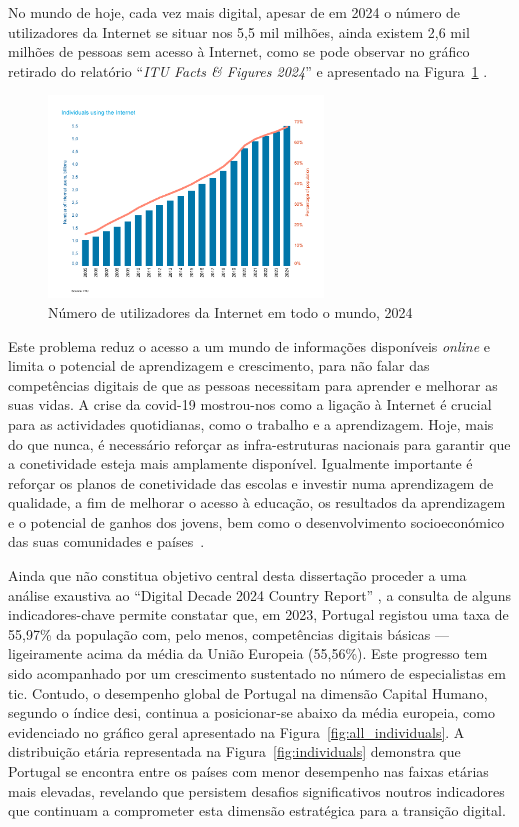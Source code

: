No mundo de hoje, cada vez mais digital, apesar de em 2024 o número de utilizadores da Internet se situar nos 5,5 mil milhões, ainda existem 2,6 mil milhões de pessoas sem acesso à Internet, como se pode observar no gráfico retirado do relatório ``\textit{ITU Facts \& Figures 2024}'' e apresentado na Figura~\ref{fig:numutilizadoresnet} \cite{broadbandcomission, itu2024facts}.

\begin{figure}[hbtp]
    \centering
    \includegraphics[width=0.65\textwidth]{figures/ITU-InternetUse.png}
    \caption{Número de utilizadores da Internet em todo o mundo, 2024 \cite{itu2024facts}}
    \label{fig:numutilizadoresnet}
\end{figure}
Este problema reduz o acesso a um mundo de informações disponíveis \textit{online} e limita o potencial de aprendizagem e crescimento, para não falar das competências digitais de que as pessoas necessitam para aprender e melhorar as suas vidas.
A crise da \acrshort{covid-19} mostrou-nos como a ligação à Internet é crucial para as actividades quotidianas, como o trabalho e a aprendizagem. Hoje, mais do que nunca, é necessário reforçar as infra-estruturas nacionais para garantir que a conetividade esteja mais amplamente disponível. Igualmente importante é reforçar os planos de conetividade das escolas e investir numa aprendizagem de qualidade, a fim de melhorar o acesso à educação, os resultados da aprendizagem e o potencial de ganhos dos jovens, bem como o desenvolvimento socioeconómico das suas comunidades e países~\cite{TheDigitransf}.

Ainda que não constitua objetivo central desta dissertação proceder a uma análise exaustiva ao ``Digital Decade 2024 Country Report'' \cite{DESI2024}, a consulta de alguns indicadores-chave permite constatar que, em 2023, Portugal registou uma taxa de 55,97\% da população com, pelo menos, competências digitais básicas — ligeiramente acima da média da União Europeia (55,56\%). Este progresso tem sido acompanhado por um crescimento sustentado no número de especialistas em \acrshort{tic}.
Contudo, o desempenho global de Portugal na dimensão Capital Humano, segundo o índice \acrshort{desi}, continua a posicionar-se abaixo da média europeia, como evidenciado no gráfico geral apresentado na Figura~\ref{fig:all_individuals}. A distribuição etária representada na Figura~\ref{fig:individuals} demonstra que Portugal se encontra entre os países com menor desempenho nas faixas etárias mais elevadas, revelando que persistem desafios significativos noutros indicadores que continuam a comprometer esta dimensão estratégica para a transição digital.

